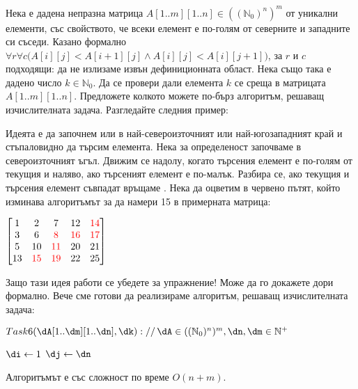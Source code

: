 \begin{problem}
	Нека е дадена непразна матрица $A[1..m][1..n]\in((\mathbb{N}_0)^n)^m$ от уникални елементи, със свойството, че всеки елемент е по-голям от северните и западните си съседи. Казано формално $\forall r\forall c\big(A[i][j]<A[i+1][j]\land A[i][j]<A[i][j+1]\big)$, за $r$ и $c$ подходящи: да не излизаме извън дефиниционната област. Нека също така е дадено число $k\in\mathbb{N}_0$. Да се провери дали елемента $k$ се среща в матрицата $A[1..m][1..n]$. Предложете колкото можете по-бърз алгоритъм, решаващ изчислителната задача. Разгледайте следния пример:
\end{problem}
\begin{solution}
	Идеята е да започнем или в най-североизточният или най-югозападният край и стъпаловидно да търсим елемента. Нека за определеност започваме в североизточният ъгъл. Движим се надолу, когато търсения елемент е по-голям от текущия и наляво, ако търсеният елемент е по-малък. Разбира се, ако текущия и търсения елемент съвпадат връщаме . Нека да оцветим в червено пътят, който изминава алгоритъмът за да намери 15 в примерната матрица:
	\begin{center}
		$\begin{bmatrix}
			1 &  2 &  7 & 12 & \textcolor{red}{14}\\
			3 &  6 &  \textcolor{red}8 & \textcolor{red}{16} & \textcolor{red}{17}\\
			5 & 10 & \textcolor{red}{11} & 20 & 21\\
			13 & \textcolor{red}{15} & \textcolor{red}{19} & 22 & 25
		 \end{bmatrix}$
	\end{center}
	Защо тази идея работи се убедете за упражнение! Може да го докажете дори формално. Вече сме готови да реализираме алгоритъм, решаващ изчислителната задача:
	\begin{pseudocode}
		
		$Task6(\dA[1..\dm][1..\dn],\dk)://\,\dA\in((\mathbb{N}_0)^n)^m,\dn,\dm\in\mathbb{N}^+$
		\Mybegin
		{
			$\di\leftarrow1$\;
			$\dj\leftarrow\dn$\;
			
			{
				\If{$\dA[\di][\dj]=\dk$}{\KwRet{\True\;}}
			}
			\KwRet{\False\;}
		}
	\end{pseudocode}
	Алгоритъмът е със сложност по време $O(n+m)$.
\end{solution}
